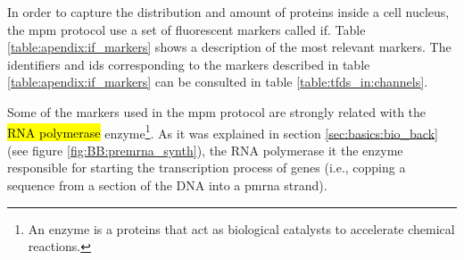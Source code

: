 
\glsresetall

In order to capture the distribution and amount of proteins inside a cell nucleus, the \gls{mpm} protocol use a set of fluorescent markers called \gls{if}. Table \ref{table:apendix:if_markers} shows a description of the most relevant markers. The identifiers and ids corresponding to the markers described in table \ref{table:apendix:if_markers} can be consulted in table \ref{table:tfds_in:channels}.

Some of the markers used in the \gls{mpm} protocol are strongly related with the \hl{RNA polymerase} enzyme\footnote{An enzyme is a proteins that act as biological catalysts to accelerate chemical reactions.}. As it was explained in section \ref{sec:basics:bio_back} (see figure \ref{fig:BB:premrna_synth}), the RNA polymerase it the enzyme responsible for starting the transcription process of genes (i.e., copping a sequence from a section of the DNA into a \gls{pmrna} strand).

\setlength{\mylinewidth}{\linewidth-7pt}%
\setlength{\mylengtha}{0.24\mylinewidth-2\arraycolsep}%
\setlength{\mylengthb}{0.76\mylinewidth-2\arraycolsep}%

